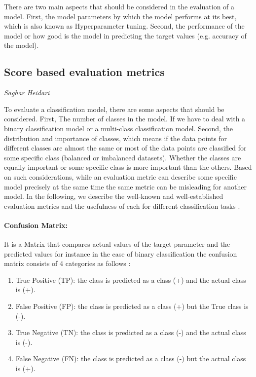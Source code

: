 There are two main aspects that should be considered in the evaluation of a model. First, the model parameters by which the model performs at its best, which is also known as Hyperparameter tuning. Second, the performance of the model or how good is the model in predicting the target values (e.g. accuracy of the model).

\subsection{Score based evaluation metrics}
\vspace*{-12mm}
\hfill{\normalsize\emph{Saghar Heidari}}

To evaluate a classification model, there are some aspects that should be considered. First, The number of classes in the model. If we have to deal with a binary classification model or a multi-class classification model. Second, the distribution and importance of classes, which means if the data points for different classes are almost the same or most of the data points are classified for some specific class (balanced or imbalanced datasets). Whether the classes are equally important or some specific class is more important than the others. Based on such considerations, while an evaluation metric can describe some specific model precisely at the same time the same metric can be misleading for another model. In the following, we describe the well-known and well-established evaluation metrics and the usefulness of each for different classification tasks \cite{DBLP:journals/prl/FerriHM09, hasan2020health}.

\paragraph{Confusion Matrix:}
It is a Matrix that compares actual values of the target parameter and the predicted values for instance in the case of binary classification the confusion matrix consists of 4 categories as follows \cite{DBLP:journals/corr/BrancoTR15, article}:
\begin{enumerate}
\item{True Positive (TP):} the class is predicted as a class (+) and the actual class is (+). \vspace*{-6.5mm}
\item{False Positive (FP):} the class is predicted as a class (+) but the True class is (-). \vspace*{-6.5mm}
\item{True Negative (TN):} the class is predicted as a class (-) and the actual class is (-). \vspace*{-6.5mm}
\item{False Negative (FN):} the class is predicted as a class (-) but the actual class is (+).
\end{enumerate}

